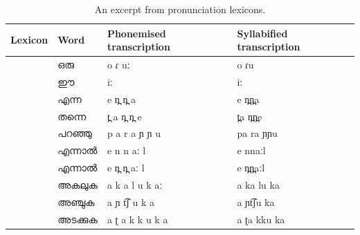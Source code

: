 \begin{table}[htpb]
	\begin{center}
		\caption{An excerpt from pronunciation lexicons.}\label{tab:lexiconsamples}
		\begin{tabular}{@{}p{1.5cm}p{2cm}p{2.7cm}p{2.9cm}@{}}
			\hline
			\hline
			Lexicon                                       & Word           & Phonemised transcription        & Syllabified transcription \\
			\hline
			\multirow{6}{*}{\rotatebox{60}{Common words}} & {\mal ഒരു}      & {\ipa o ɾ uː}                   & {\ipa o ɾu}               \\
			                                              & {\mal ഈ}       & {\ipa iː}                       & {\ipa iː}                 \\
			                                              & {\mal എന്ന}     & {\ipa e n̪ n̪ a}                  & {\ipa e n̪n̪a}              \\
			                                              & {\mal തന്നെ}     & {\ipa t̪ a n̪ n̪ e}                & {\ipa t̪a n̪n̪e}             \\
			                                              & {\mal പറഞ്ഞു}    & {\ipa p a r a ɲ ɲ u}            & {\ipa pa ra ɲɲu }         \\
			                                              & {\mal എന്നാൽ}    & {\ipa e n n aː l}               & {\ipa e nnaːl}            \\
			                                              & {\mal എന്നാൽ}    & {\ipa e n̪ n̪ aː l}               & {\ipa e n̪n̪aːl}            \\

			\hline
			\multirow{3}{*}{\rotatebox{60}{Verbs}}        & {\mal അകലുക}    & {\ipa a k a l u k aː}           & {\ipa a ka lu ka}         \\
			                                              & {\mal അഞ്ചുക}    & {\ipa a ɲ t͡ʃ u k a}             & {\ipa a ɲt͡ʃu ka}          \\
			                                              & {\mal അടക്കുക}   & {\ipa a ʈ a k k u k a   }       & {\ipa a ʈa kku ka}        \\


\end{tabular}
\end{center}
\end{table}
